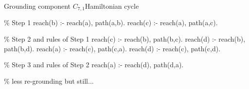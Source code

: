 \begin{frame}{Grounding component \(C_{7,1}\)}{Hamiltonian cycle}
  \begin{SemiVerbatim}{.9}
    {\color{comment}\% Step 1}
    reach(b) :- \alert{reach(a)}, \alert{path(a,b)}.
    reach(c) :- \alert{reach(a)}, \alert{path(a,c)}.

    {\color{comment}\% Step 2 \alert{and} rules of Step 1}
    reach(c) :- \alert{reach(b)}, path(b,c).
    reach(d) :- \alert{reach(b)}, path(b,d).
    reach(a) :- \alert{reach(c)}, path(c,a).
    reach(d) :- \alert{reach(c)}, path(c,d).

      {\color{comment}\% Step 3 \alert{and} rules of Step 2}
    reach(a) :- \alert{reach(d)}, path(d,a).

      {\color{comment}\% less re-grounding but still...}
  \end{SemiVerbatim}
\end{frame}
%
